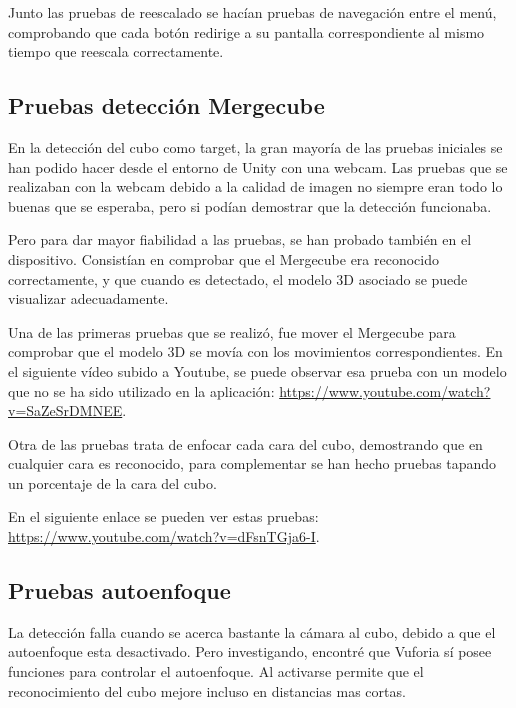 Junto las pruebas de reescalado se hacían pruebas de navegación entre el menú, comprobando que cada botón redirige a su pantalla correspondiente al mismo tiempo que reescala correctamente.


\subsection{Pruebas detección Mergecube}
En la detección del cubo como target, la gran mayoría de las pruebas iniciales se han podido hacer desde el entorno de Unity con una webcam. Las pruebas que se realizaban con la webcam debido a la calidad de imagen no siempre eran todo lo buenas que se esperaba, pero si podían demostrar que la detección funcionaba.

Pero para dar mayor fiabilidad a las pruebas, se han probado también en el dispositivo. Consistían en comprobar que el Mergecube era reconocido correctamente, y que cuando es detectado, el modelo 3D asociado se puede visualizar adecuadamente.

Una de las primeras pruebas que se realizó, fue mover el Mergecube para comprobar que el modelo 3D se movía con los movimientos correspondientes. En el siguiente vídeo subido a Youtube, se puede observar esa prueba con un modelo que no se ha sido utilizado en la aplicación: \url{https://www.youtube.com/watch?v=SaZeSrDMNEE}.

Otra de las pruebas trata de enfocar cada cara del cubo, demostrando que en cualquier cara es reconocido, para complementar se han hecho pruebas tapando un porcentaje de la cara del cubo. 

En el siguiente enlace se pueden ver estas pruebas:\\ \url{https://www.youtube.com/watch?v=dFsnTGja6-I}.

\subsection{Pruebas autoenfoque}
La detección falla cuando se acerca bastante la cámara al cubo, debido a que el autoenfoque esta desactivado. Pero investigando, encontré que Vuforia sí posee funciones para controlar el autoenfoque. Al activarse permite que el reconocimiento del cubo mejore incluso en distancias mas cortas.

